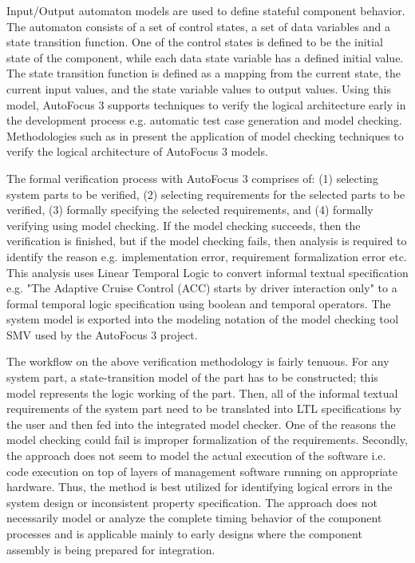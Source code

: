 Input/Output automaton models are used to define stateful component behavior.
The automaton consists of a set of control states, a set of data variables and a
state transition function. One of the control states is defined to be the
initial state of the component, while each data state variable has a defined
initial value. The state transition function is defined as a mapping from the
current state, the current input values, and the state variable values to output
values. Using this model, AutoFocus 3 supports techniques to verify the logical
architecture early in the development process e.g. automatic test case
generation and model checking. Methodologies such as in \cite{feilkas2009top}
present the application of model checking techniques to verify the logical
architecture of AutoFocus 3 models.

The formal verification process with AutoFocus 3 comprises of: (1) selecting
system parts to be verified, (2) selecting requirements for the selected parts
to be verified, (3) formally specifying the selected requirements, and (4)
formally verifying using model checking. If the model checking succeeds, then
the verification is finished, but if the model checking fails, then analysis is
required to identify the reason e.g. implementation error, requirement
formalization error etc. This analysis uses Linear Temporal Logic
\cite{gabbay1994temporal} to convert informal textual specification e.g. "The
Adaptive Cruise Control (ACC) starts by driver interaction only" to a formal
temporal logic specification using boolean and temporal operators. The system
model is exported into the modeling notation of the model checking tool SMV
\cite{mcmillan1993symbolic, mcmillan1999getting} used by the AutoFocus 3
project.

The workflow on the above verification methodology is fairly tenuous. For any
system part, a state-transition model of the part has to be constructed; this
model represents the logic working of the part. Then, all of the informal
textual requirements of the system part need to be translated into LTL
specifications by the user and then fed into the integrated model checker. One
of the reasons the model checking could fail is improper formalization of the
requirements. Secondly, the approach does not seem to model the actual execution
of the software i.e. code execution on top of layers of management software
running on appropriate hardware. Thus, the method is best utilized for
identifying logical errors in the system design or inconsistent property
specification. The approach does not necessarily model or analyze the complete
timing behavior of the component processes and is applicable mainly to early
designs where the component assembly is being prepared for integration.
 
